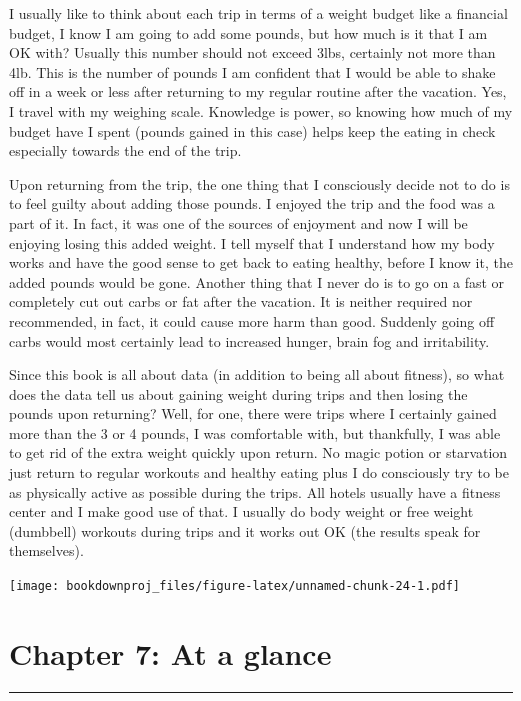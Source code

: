 \documentclass[
  oneside]{book}
\begin{document}
I usually like to think about each trip in terms of a weight budget like a financial budget, I know I am going to add some pounds, but how much is it that I am OK with? Usually this number should not exceed 3lbs, certainly not more than 4lb. This is the number of pounds I am confident that I would be able to shake off in a week or less after returning to my regular routine after the vacation. Yes, I travel with my weighing scale. Knowledge is power, so knowing how much of my budget have I spent (pounds gained in this case) helps keep the eating in check especially towards the end of the trip.

Upon returning from the trip, the one thing that I consciously decide not to do is to feel guilty about adding those pounds. I enjoyed the trip and the food was a part of it. In fact, it was one of the sources of enjoyment and now I will be enjoying losing this added weight. I tell myself that I understand how my body works and have the good sense to get back to eating healthy, before I know it, the added pounds would be gone. Another thing that I never do is to go on a fast or completely cut out carbs or fat after the vacation. It is neither required nor recommended, in fact, it could cause more harm than good. Suddenly going off carbs would most certainly lead to increased hunger, brain fog and irritability.

Since this book is all about data (in addition to being all about fitness), so what does the data tell us about gaining weight during trips and then losing the pounds upon returning? Well, for one, there were trips where I certainly gained more than the 3 or 4 pounds, I was comfortable with, but thankfully, I was able to get rid of the extra weight quickly upon return. No magic potion or starvation just return to regular workouts and healthy eating plus I do consciously try to be as physically active as possible during the trips. All hotels usually have a fitness center and I make good use of that. I usually do body weight or free weight (dumbbell) workouts during trips and it works out OK (the results speak for themselves).

\texttt{[image: bookdownproj\_files/figure-latex/unnamed-chunk-24-1.pdf]}

\hypertarget{chapter-7-at-a-glance}{%
\section{Chapter 7: At a glance}\label{chapter-7-at-a-glance}}

\begin{center}\rule{0.5\linewidth}{0.5pt}\end{center}
\end{document}
